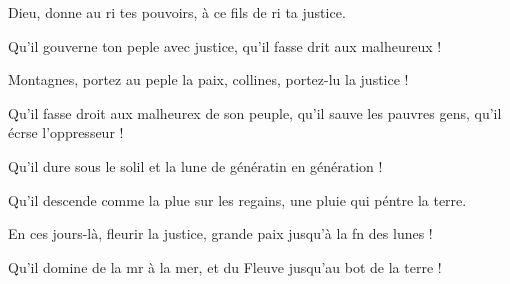 \item Dieu, donne au ri tes pouvoirs,\psstar{} à ce fils de ri ta justice.
\item Qu’il gouverne ton peple avec justice,\psstar{} qu’il fasse drit aux malheureux !
\item Montagnes, portez au peple la paix,\psstar{} collines, portez-lu la justice !
\item Qu’il fasse droit aux malheurex de son peuple,\psstar{} qu’il sauve les pauvres gens, qu’il écrse l’oppresseur !
\item Qu’il dure sous le solil et la lune\psstar{} de génératin en génération !
\item Qu’il descende comme la plue sur les regains,\psstar{} une pluie qui péntre la terre.
\item En ces jours-là, fleurir la justice,\psstar{} grande paix jusqu’à la fn des lunes !
\item Qu’il domine de la mr à la mer,\psstar{} et du Fleuve jusqu’au bot de la terre !